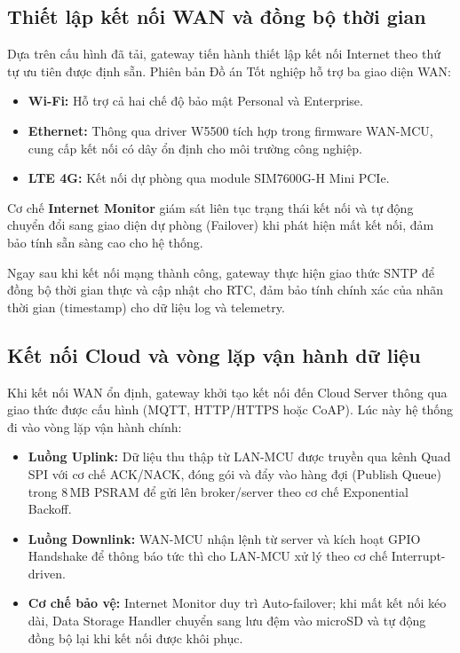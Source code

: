     \subsection{Thiết lập kết nối WAN và đồng bộ thời gian}

    Dựa trên cấu hình đã tải, gateway tiến hành thiết lập kết nối Internet theo thứ tự ưu tiên được định sẵn. Phiên bản Đồ án Tốt nghiệp hỗ trợ ba giao diện WAN:

    \begin{itemize}
        \item \textbf{Wi-Fi:} Hỗ trợ cả hai chế độ bảo mật Personal và Enterprise.
        \item \textbf{Ethernet:} Thông qua driver W5500 tích hợp trong firmware WAN-MCU, cung cấp kết nối có dây ổn định cho môi trường công nghiệp.
        \item \textbf{LTE 4G:} Kết nối dự phòng qua module SIM7600G-H Mini PCIe.
    \end{itemize}

    Cơ chế \textbf{Internet Monitor} giám sát liên tục trạng thái kết nối và tự động chuyển đổi sang giao diện dự phòng (Failover) khi phát hiện mất kết nối, đảm bảo tính sẵn sàng cao cho hệ thống.

    Ngay sau khi kết nối mạng thành công, gateway thực hiện giao thức SNTP để đồng bộ thời gian thực và cập nhật cho RTC, đảm bảo tính chính xác của nhãn thời gian (timestamp) cho dữ liệu log và telemetry.

    \subsection{Kết nối Cloud và vòng lặp vận hành dữ liệu}

    Khi kết nối WAN ổn định, gateway khởi tạo kết nối đến Cloud Server thông qua giao thức được cấu hình (MQTT, HTTP/HTTPS hoặc CoAP). Lúc này hệ thống đi vào vòng lặp vận hành chính:

    \begin{itemize}
        \item \textbf{Luồng Uplink:} Dữ liệu thu thập từ LAN-MCU được truyền qua kênh Quad SPI với cơ chế ACK/NACK, đóng gói và đẩy vào hàng đợi (Publish Queue) trong 8\,MB PSRAM để gửi lên broker/server theo cơ chế Exponential Backoff.
        \item \textbf{Luồng Downlink:} WAN-MCU nhận lệnh từ server và kích hoạt GPIO Handshake để thông báo tức thì cho LAN-MCU xử lý theo cơ chế Interrupt-driven.
        \item \textbf{Cơ chế bảo vệ:} Internet Monitor duy trì Auto-failover; khi mất kết nối kéo dài, Data Storage Handler chuyển sang lưu đệm vào microSD và tự động đồng bộ lại khi kết nối được khôi phục.
    \end{itemize}

